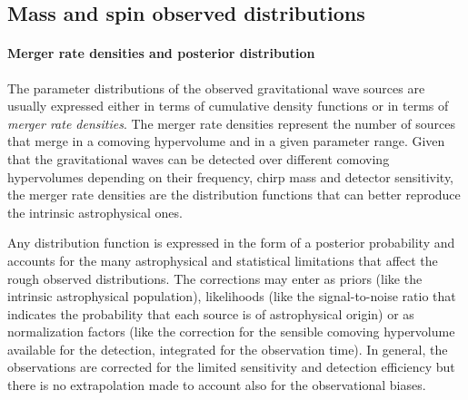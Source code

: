\documentclass[a4paper,titlepage]{book}     	%
\begin{document}
\subsection{Mass and spin observed distributions}\label{subsec:GWmassspin}%

\paragraph{Merger rate densities and posterior distribution}
The parameter distributions of the observed gravitational wave sources are usually expressed either in terms of cumulative density functions or in terms of \emph{merger rate densities}. The merger rate densities represent the number of sources that merge in a comoving hypervolume and in a given parameter range. Given that the gravitational waves can be detected over different comoving hypervolumes depending on their frequency, chirp mass and detector sensitivity, the merger rate densities are the distribution functions that can better reproduce the intrinsic astrophysical ones.

Any distribution function is expressed in the form of a posterior probability and accounts for the many astrophysical and statistical limitations that affect the rough observed distributions. The corrections may enter as priors (like the intrinsic astrophysical population), likelihoods (like the signal-to-noise ratio that indicates the probability that each source is of astrophysical origin) or as normalization factors (like the correction for the sensible comoving hypervolume available for the detection, integrated for the observation time). In general, the observations are corrected for the limited sensitivity and detection efficiency but there is no extrapolation made to account also for the observational biases. \cite{GWTC-3}
\end{document}
